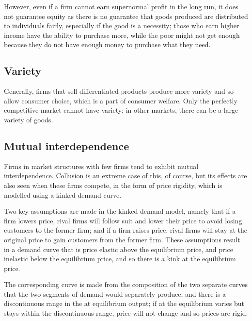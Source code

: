 \documentclass[Economics.tex]{subfiles}
\begin{document}
However, even if a firm cannot earn supernormal profit in the long run, it does not guarantee equity as there is no guarantee that goods produced are distributed to individuals fairly, especially if the good is a necessity; those who earn higher income have the ability to purchase more, while the poor might not get enough because they do not have enough money to purchase what they need.
\subsection{Variety}
Generally, firms that sell differentiated products produce more variety and so allow consumer choice, which is a part of consumer welfare. Only the perfectly competitive market cannot have variety; in other markets, there can be a large variety of goods.
\subsection{Mutual interdependence}
Firms in market structures with few firms tend to exhibit mutual interdependence. Collusion is an extreme case of this, of course, but its effects are also seen when these firms compete, in the form of price rigidity, which is modelled using a kinked demand curve.

Two key assumptions are made in the kinked demand model, namely that if a firm lowers price, rival firms will follow suit and lower their price to avoid losing customers to the former firm; and if a firm raises price, rival firms will stay at the original price to gain customers from the former firm. These assumptions result in a demand curve that is price elastic above the equilibrium price, and price inelastic below the equilibrium price, and so there is a kink at the equilibrium price.

The corresponding  curve is made from the composition of the two separate  curves that the two segments of demand would separately produce, and there is a discontinuous range in the  at equilibrium output; if  at the equilibrium varies but stays within the discontinuous range, price will not change and so prices are rigid.
\end{document}
